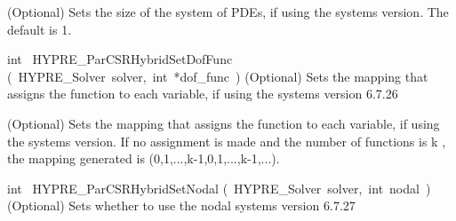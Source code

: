 \documentclass{article}
\begin{document}
\begin{cxxentry}
\begin{cxxentry}
\begin{cxxfunction}
\begin{cxxdoc}
(Optional) Sets the size of the system of PDEs, if using the systems version.
The default is 1.
\end{cxxdoc}
\end{cxxfunction}
\begin{cxxfunction}
{int\ }
        {HYPRE\_ParCSRHybridSetDofFunc}
        {(\ HYPRE\_Solver\ solver,\ int\ *dof\_func\ )}
        {
(Optional) Sets the mapping that assigns the function to each variable,
if using the systems version}
        {6.7.26}
\begin{cxxdoc}

(Optional) Sets the mapping that assigns the function to each variable,
if using the systems version. If no assignment is made and the number of
functions is k , the mapping generated is (0,1,...,k-1,0,1,...,k-1,...).
\end{cxxdoc}
\end{cxxfunction}
\begin{cxxfunction}
{int\ }
        {HYPRE\_ParCSRHybridSetNodal}
        {(\ HYPRE\_Solver\ solver,\ int\ nodal\ )}
        {
(Optional) Sets whether to use the nodal systems version}
        {6.7.27}
\begin{cxxdoc}


\end{cxxdoc}
\end{cxxfunction}
\end{cxxentry}
\end{cxxentry}
\end{document}
